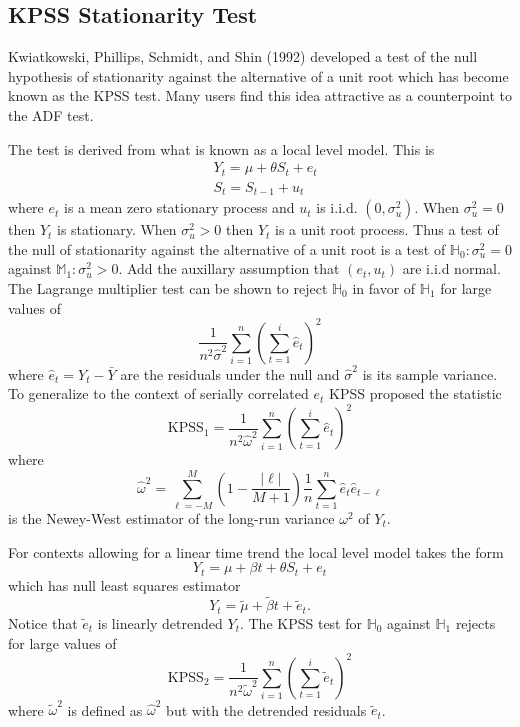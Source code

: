 \documentclass[10pt]{article}
\begin{document}
\subsection{KPSS Stationarity Test}
Kwiatkowski, Phillips, Schmidt, and Shin (1992) developed a test of the null hypothesis of stationarity against the alternative of a unit root which has become known as the KPSS test. Many users find this idea attractive as a counterpoint to the ADF test.

The test is derived from what is known as a local level model. This is
$$
\begin{aligned}
&Y_{t}=\mu+\theta S_{t}+e_{t} \\
&S_{t}=S_{t-1}+u_{t}
\end{aligned}
$$
where $e_{t}$ is a mean zero stationary process and $u_{t}$ is i.i.d. $\left(0, \sigma_{u}^{2}\right)$. When $\sigma_{u}^{2}=0$ then $Y_{t}$ is stationary. When $\sigma_{u}^{2}>0$ then $Y_{t}$ is a unit root process. Thus a test of the null of stationarity against the alternative of a unit root is a test of $\mathbb{H}_{0}: \sigma_{u}^{2}=0$ against $\mathbb{M}_{1}: \sigma_{u}^{2}>0$. Add the auxillary assumption that $\left(e_{t}, u_{t}\right)$ are i.i.d normal. The Lagrange multiplier test can be shown to reject $\mathbb{H}_{0}$ in favor of $\mathbb{H}_{1}$ for large values of
$$
\frac{1}{n^{2} \widehat{\sigma}^{2}} \sum_{i=1}^{n}\left(\sum_{t=1}^{i} \widehat{e}_{t}\right)^{2}
$$
where $\widehat{e}_{t}=Y_{t}-\bar{Y}$ are the residuals under the null and $\widehat{\sigma}^{2}$ is its sample variance. To generalize to the context of serially correlated $e_{t}$ KPSS proposed the statistic
$$
\mathrm{KPSS}_{1}=\frac{1}{n^{2} \widehat{\omega}^{2}} \sum_{i=1}^{n}\left(\sum_{t=1}^{i} \widehat{e}_{t}\right)^{2}
$$
where
$$
\widehat{\omega}^{2}=\sum_{\ell=-M}^{M}\left(1-\frac{|\ell|}{M+1}\right) \frac{1}{n} \sum_{t=1}^{n} \widehat{e}_{t} \widehat{e}_{t-\ell}
$$
is the Newey-West estimator of the long-run variance $\omega^{2}$ of $Y_{t}$.

For contexts allowing for a linear time trend the local level model takes the form
$$
Y_{t}=\mu+\beta t+\theta S_{t}+e_{t}
$$
which has null least squares estimator
$$
Y_{t}=\widetilde{\mu}+\widetilde{\beta} t+\widetilde{e}_{t} .
$$
Notice that $\widetilde{e}_{t}$ is linearly detrended $Y_{t}$. The KPSS test for $\mathbb{H}_{0}$ against $\mathbb{H}_{1}$ rejects for large values of
$$
\mathrm{KPSS}_{2}=\frac{1}{n^{2} \widetilde{\omega}^{2}} \sum_{i=1}^{n}\left(\sum_{t=1}^{i} \widetilde{e}_{t}\right)^{2}
$$
where $\widetilde{\omega}^{2}$ is defined as $\widehat{\omega}^{2}$ but with the detrended residuals $\widetilde{e}_{t}$.
\end{document}
